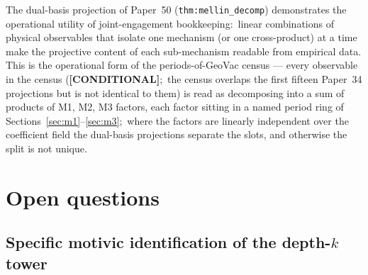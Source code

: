 \documentclass[11pt,a4paper]{article}
\theoremstyle{plain}
\theoremstyle{definition}
\begin{document}
The dual-basis projection of Paper~50 (\texttt{thm:mellin\_decomp}) demonstrates the
operational utility of joint-engagement bookkeeping:\ linear
combinations of physical observables that isolate one mechanism (or
one cross-product) at a time make the projective content of each
sub-mechanism readable from empirical data.  This is the operational
form of the periods-of-GeoVac census --- every observable in the census
(\textbf{[CONDITIONAL]};\ the census overlaps the first fifteen Paper~34
projections but is not identical to them) is read as decomposing into a
sum of products of M1, M2, M3 factors, each factor sitting in a named
period ring of Sections~\ref{sec:m1}--\ref{sec:m3};\ where the factors
are linearly independent over the coefficient field the dual-basis
projections separate the slots, and otherwise the split is not unique.

\section{Open questions}
\label{sec:open}

\subsection{Specific motivic identification of the depth-$k$ tower}
\end{document}
